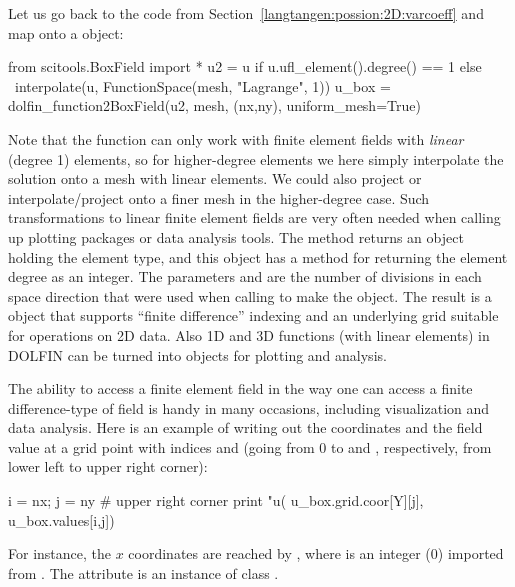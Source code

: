 Let us go back to the  code from
Section~\ref{langtangen:possion:2D:varcoeff} and map  onto a
 object:
\begin{python}
from scitools.BoxField import *
u2 = u if u.ufl_element().degree() == 1 else \
     interpolate(u, FunctionSpace(mesh, "Lagrange", 1))
u_box = dolfin_function2BoxField(u2, mesh, (nx,ny), uniform_mesh=True)
\end{python}
Note that the function
 can only work
with finite element fields with \emph{linear} (degree 1) elements, so
for higher-degree elements we here simply interpolate the solution
onto a mesh with linear elements. We could also project
 or interpolate/project onto a finer
mesh in the higher-degree case.  Such transformations to linear finite
element fields are very often needed when calling up plotting packages
or data analysis tools.  The
 method returns an object
holding the element type, and this object has a method
 for returning the element
degree as an integer.  The parameters
 and
 are the number of divisions in each
space direction that were used when calling
 to make the
 object.  The result
 is a
 object that supports ``finite
difference'' indexing and an underlying grid suitable for
 operations on 2D data.  Also 1D
and 3D functions (with linear elements) in DOLFIN can be turned
into  objects for plotting and
analysis.

The ability to access a finite element field in the way one can access
a finite difference-type of field is handy in many occasions,
including visualization and data analysis.  Here is an example of
writing out the coordinates and the field value at a grid point with
indices \emp{i} and
 (going from 0 to
 and
, respectively, from lower left to
upper right corner):
\begin{python}
i = nx; j = ny   # upper right corner
print "u(%
                       u_box.grid.coor[Y][j],
                       u_box.values[i,j])
\end{python}
For instance,
the $x$ coordinates are reached by , where
\emp{X} is an integer (0) imported from \emp{scitools.BoxField}.
The \emp{grid} attribute is an instance of class .

